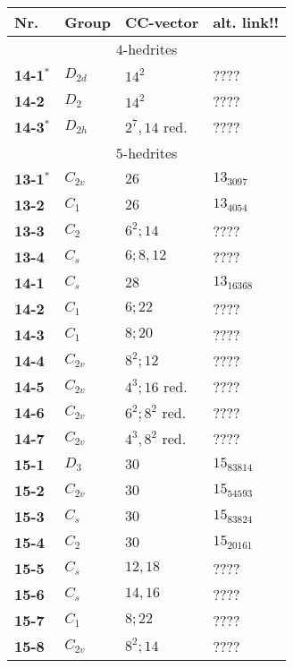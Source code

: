 \documentclass[12pt]{article}
\begin{document}
\begin{table}
\begin{center}
{\scriptsize
\begin{minipage}{7cm}
\begin{tabular}{||l|l|l|l||}
\hline\hline
Nr.     &Group    &CC-vector      &alt. link!!\\\hline\hline
\multicolumn{4}{||c||}{$4$-hedrites}\\\hline
{\bf 14-1${}^*$}&$D_{2d}$       &$14^2$         &????\\
{\bf 14-2}      &$D_2$  &$14^2$         &????\\ 
{\bf 14-3${}^*$}&$D_{2h}$       &$2^7, 14$ red.  &????\\\hline\hline
\multicolumn{4}{||c||}{$5$-hedrites}\\\hline
{\bf 13-1${}^*$}&$C_{2v}$       &$26$           &$13_{3097}$\\
{\bf 13-2}      &$C_1$  &$26$           &$13_{4054}$\\
{\bf 13-3}      &$C_2$  &$6^2; 14$      &????\\
{\bf 13-4}      &$C_s$  &$6; 8, 12$     &????\\\hline
{\bf 14-1}      &$C_s$  &$28$           &$13_{16368}$\\
{\bf 14-2}      &$C_1$  &$6; 22$                &????\\
{\bf 14-3}      &$C_1$  &$8; 20$                &????\\
{\bf 14-4}      &$C_{2v}$       &$8^2; 12$      &????\\
{\bf 14-5}      &$C_{2v}$       &$4^3; 16$ red. &????\\
{\bf 14-6}      &$C_{2v}$       &$6^2; 8^2$ red.        &????\\
{\bf 14-7}      &$C_{2v}$       &$4^3, 8^2$ red.        &????\\\hline
{\bf 15-1}      &$D_3$  &$30$   &$15_{83814}$\\
{\bf 15-2}      &$C_{2v}$       &$30$   &$15_{54593}$\\
{\bf 15-3}      &$C_s$  &$30$   &$15_{83824}$\\
{\bf 15-4}      &$C_2$  &$30$   &$15_{20161}$\\
{\bf 15-5}      &$C_s$  &$12,18$        &????\\
{\bf 15-6}      &$C_s$  &$14,16$        &????\\
{\bf 15-7}      &$C_1$  &$8;22$ &????\\
{\bf 15-8}      &$C_{2v}$       &       $8^2;14$&????\\

\end{tabular}
\end{minipage}}
\end{center}
\end{table}
\end{document}

